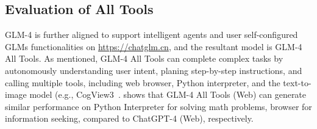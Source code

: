 \subsection{Evaluation of All Tools}

GLM-4 is further aligned to support intelligent agents and user self-configured GLMs functionalities on \url{https://chatglm.cn}, and the resultant model is GLM-4 All Tools. 
As mentioned, GLM-4 All Tools can  complete complex tasks by autonomously understanding user intent, planing step-by-step instructions, and calling multiple tools, including web browser, Python interpreter, and the text-to-image model (e.g., CogView3~\cite{zheng2024cogview3}. 
 shows that GLM-4 All Tools (Web) can generate similar performance on Python Interpreter for solving math problems, browser for information seeking, compared to ChatGPT-4 (Web), respectively. 

\begin{table}[!ht]
\centering
\renewcommand{\arraystretch}{1.5}
\caption{Performance of GLM-4 All Tools.}
\label{tb:alltools}
\end{table}
